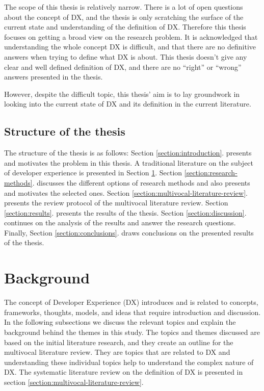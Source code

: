 \documentclass[english, 12pt, a4paper, sci, utf8, a-1b, online]{aaltothesis}
\begin{document}
The scope of this thesis is relatively narrow. There is a lot of open questions about the concept of DX, and the thesis is only scratching the surface of the current state and understanding of the definition of DX. Therefore this thesis focuses on getting a broad view on the research problem. It is acknowledged that understanding the whole concept DX is difficult, and that there are no definitive answers when trying to define what DX is about. This thesis doesn't give any clear and well defined definition of DX, and there are no ``right'' or ``wrong'' answers presented in the thesis. 

However, despite the difficult topic, this thesis' aim is to lay groundwork in looking into the current state of DX and its definition in the current literature.

\subsection{Structure of the thesis}

The structure of the thesis is as follows: Section \ref{section:introduction}. presents and motivates the problem in this thesis. A traditional literature on the subject of developer experience is presented in Section \ref{section:background}. Section \ref{section:research-methods}. discusses the different options of research methods and also presents and motivates the selected ones. Section \ref{section:multivocal-literature-review}. presents the review protocol of the multivocal literature review. Section \ref{section:results}. presents the results of the thesis. Section \ref{section:discussion}. continues on the analysis of the results and answer the research questions. Finally, Section \ref{section:conclusions}. draws conclusions on the presented results of the thesis.

\clearpage
\section{Background} \label{section:background}

The concept of Developer Experience (DX) introduces and is related to concepts, frameworks, thoughts, models, and ideas that require introduction and discussion. In the following subsections we discuss the relevant topics and explain the background behind the themes in this study. The topics and themes discussed are based on the initial literature research, and they create an outline for the multivocal literature review. They are topics that are related to DX and understanding these individual topics help to understand the complex nature of DX. The systematic literature review on the definition of DX is presented in section \ref{section:multivocal-literature-review}.
\end{document}
